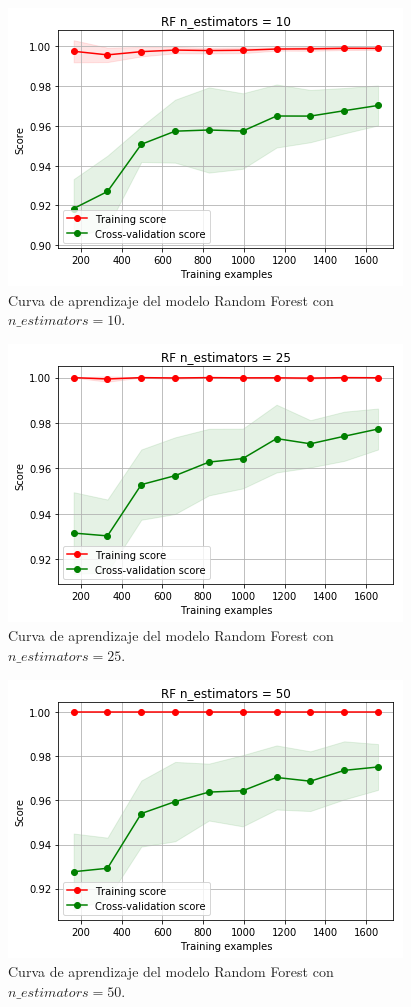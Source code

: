 \documentclass[11pt,a4paper]{article}
\begin{document}
\begin{figure}[H]
    \centering
    \includegraphics[scale=0.7]{img/lc-rf-n-10.png}
    \caption{Curva de aprendizaje del modelo Random Forest con $n\_estimators=10$.}
    \label{fig:lc-rf-n-10}
\end{figure}

\begin{figure}[H]
    \centering
    \includegraphics[scale=0.7]{img/lc-rf-n-25.png}
    \caption{Curva de aprendizaje del modelo Random Forest con $n\_estimators=25$.}
    \label{fig:lc-rf-n-25}
\end{figure}

\begin{figure}[H]
    \centering
    \includegraphics[scale=0.7]{img/lc-rf-n-50.png}
    \caption{Curva de aprendizaje del modelo Random Forest con $n\_estimators=50$.}
    \label{fig:lc-rf-n-50}
\end{figure}
\end{document}
